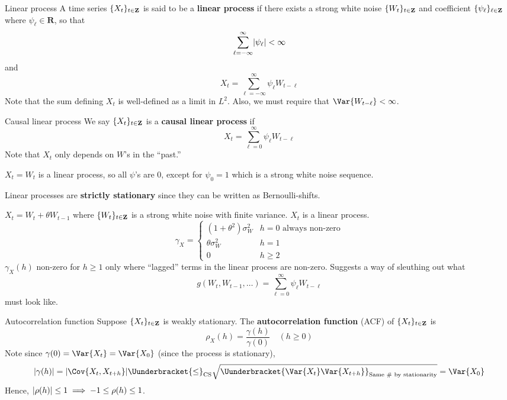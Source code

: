 \begin{Definition}{Linear process}{}
    A time series $ \{X_t\}_{t\in\mathbf{Z}} $ is said to be a
    \textbf{linear process} if there exists a strong
    white noise $ \{W_t\}_{t\in\mathbf{Z}} $ and coefficient
    $ \{\psi_\ell\}_{\ell\in\mathbf{Z}} $
    where $ \psi_\ell\in\mathbf{R} $, so that
    \[ \sum_{\ell=-\infty}^{\infty} \lvert\psi_\ell\rvert<\infty \]
    and
    \[ X_t=\sum_{\ell=-\infty}^{\infty} \psi_\ell W_{t-\ell} \]
    Note that the sum defining $ X_t $ is well-defined
    as a limit in $ L^2 $. Also, we
    must require that $ \Var{W_{t-\ell}}<\infty $.
\end{Definition}
\begin{Definition}{Causal linear process}{}
    We say $ \{X_t\}_{t\in\mathbf{Z}} $ is a \textbf{causal
        linear process} if
    \[ X_t=\sum_{\ell=0}^{\infty} \psi_\ell W_{t-\ell} \]
    Note that $ X_t $ only depends on $ W $'s in the ``past.''
\end{Definition}
\begin{Example}{}{}
    $ X_t=W_t $ is a linear process, so all
    $ \psi $'s are $ 0 $, except for $ \psi_0=1 $
    which is a strong white noise sequence.
\end{Example}
\begin{Remark}{}{}
    Linear processes are \textbf{strictly stationary} since they
    can be written as Bernoulli-shifts.
\end{Remark}
\begin{Example}{}{}
    $ X_t=W_t+\theta W_{t-1} $ where $ \{W_t\}_{t\in\mathbf{Z}} $ is a strong white noise
    with finite variance. $ X_t $ is a linear process.
    \[ \gamma_X=\begin{cases}
            (1+\theta^2)\sigma_W^2 & h=0    \text{ always non-zero} \\
            \theta\sigma_W^2       & h=1                            \\
            0                      & h\ge 2
        \end{cases} \]
    $ \gamma_X(h) $ non-zero for $ h\ge 1 $
    only where ``lagged'' terms in the linear process
    are non-zero. Suggests a way of sleuthing out what
    \[ g(W_t,W_{t-1},\ldots)=\sum_{\ell=0}^{\infty} \psi_\ell W_{t-\ell} \]
    must look like.
\end{Example}
\begin{Definition}{Autocorrelation function}{}
    Suppose $ \{X_t\}_{t\in\mathbf{Z}} $ is weakly stationary. The
    \textbf{autocorrelation function} (ACF) of $ \{X_t\}_{t\in\mathbf{Z}} $
    is
    \[ \rho_X(h)=\frac{\gamma(h)}{\gamma(0)} \quad (h\ge 0) \]
    Note since $ \gamma(0)=\Var{X_t}=\Var{X_0} $ (since the process is stationary),
    \[ \abs{\gamma(h)}=\abs{\Cov{X_t,X_{t+h}}}\Uunderbracket{\le}_{\text{CS}}
        \sqrt{\Uunderbracket{\Var{X_t}\Var{X_{t+h}}}_{\text{Same \# by stationarity}}}=\Var{X_0} \]
    Hence, $ \lvert\rho(h)\rvert\le 1\implies -1\le \rho(h)\le 1 $.
\end{Definition}
